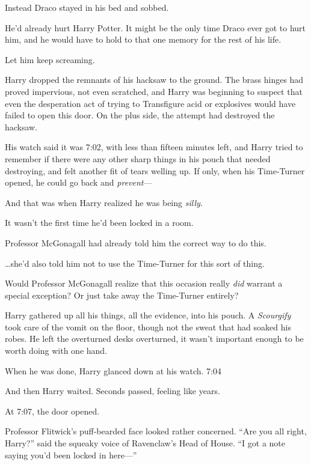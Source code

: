 Instead Draco stayed in his bed and sobbed.

He’d already hurt Harry Potter. It might be the only time Draco ever got to hurt him, and he would have to hold to that one memory for the rest of his life.

Let him keep screaming.

\later

Harry dropped the remnants of his hacksaw to the ground. The brass hinges had proved impervious, not even scratched, and Harry was beginning to suspect that even the desperation act of trying to Transfigure acid or explosives would have failed to open this door. On the plus side, the attempt had destroyed the hacksaw.

His watch said it was 7:02\pm, with less than fifteen minutes left, and Harry tried to remember if there were any other sharp things in his pouch that needed destroying, and felt another fit of tears welling up. If only, when his Time-Turner opened, he could go back and \emph{prevent}—

And that was when Harry realized he was being \emph{silly}.

It wasn’t the first time he’d been locked in a room.

Professor McGonagall had already told him the correct way to do this.

…she’d also told him not to use the Time-Turner for this sort of thing.

Would Professor McGonagall realize that this occasion really \emph{did} warrant a special exception? Or just take away the Time-Turner entirely?

Harry gathered up all his things, all the evidence, into his pouch. A \emph{Scourgify} took care of the vomit on the floor, though not the sweat that had soaked his robes. He left the overturned desks overturned, it wasn’t important enough to be worth doing with one hand.

When he was done, Harry glanced down at his watch. 7:04\pm

And then Harry waited. Seconds passed, feeling like years.

At 7:07\pm, the door opened.

Professor Flitwick’s puff-bearded face looked rather concerned. “Are you all right, Harry?” said the squeaky voice of Ravenclaw’s Head of House. “I got a note saying you’d been locked in here—”

